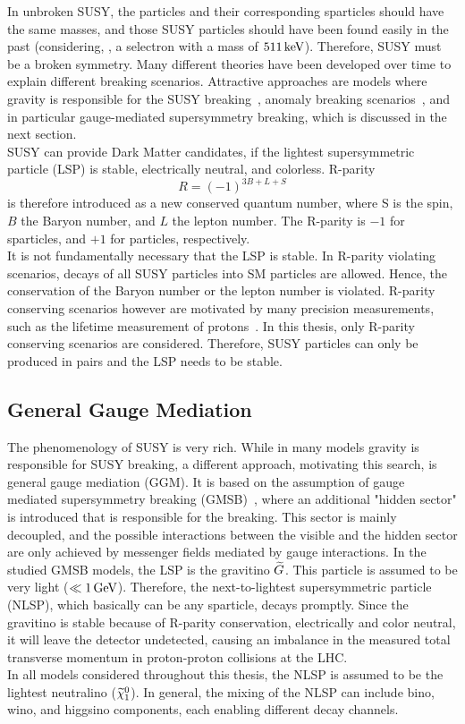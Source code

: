 In unbroken SUSY, the particles and their corresponding sparticles should have the same masses, and those SUSY particles should have been found easily in the past (considering, \eg, a selectron with a mass of $511\,\text{ke\hspace{-.08em}V}$). Therefore, SUSY must be a broken symmetry. Many different theories have been developed over time to explain different breaking scenarios. Attractive approaches are models where gravity is responsible for the SUSY breaking~\cite{SUSYPrimer}, anomaly breaking scenarios~\cite{AMSB}, and in particular gauge-mediated supersymmetry breaking, which is discussed in the next section.\\
SUSY can provide Dark Matter candidates, if the lightest supersymmetric particle (LSP) is stable, electrically neutral, and colorless.
R-parity
\begin{equation}
 R = (-1)^{3B+L+S}
\end{equation}
is therefore introduced as a new conserved quantum number, where S is the spin, $B$ the Baryon number, and $L$ the lepton number. The R-parity is $-1$ for sparticles, and $+1$ for particles, respectively.\\
It is not fundamentally necessary that the LSP is stable. In R-parity violating scenarios, decays of all SUSY particles into SM particles are allowed. Hence, the conservation of the Baryon number or the lepton number is violated. R-parity conserving scenarios however are motivated by many precision measurements, such as the lifetime measurement of protons~\cite{ProtonDecay}.
In this thesis, only R-parity conserving scenarios are considered. Therefore, SUSY particles can only be produced in pairs and the LSP needs to be stable.\\



\subsection{General Gauge Mediation}\label{sec:GGM}
The phenomenology of SUSY is very rich. While in many models gravity is responsible for SUSY breaking, a different approach, motivating this search, is general gauge mediation (GGM). It is based on the assumption of gauge mediated supersymmetry breaking (GMSB)~\cite{GGM}, where an additional "hidden sector" is introduced that is responsible for the breaking. This sector is mainly decoupled, and the possible interactions between the visible and the hidden sector are only achieved by messenger fields mediated by gauge interactions. In the studied GMSB models, the LSP is the gravitino $\widetilde{G}$. This particle is assumed to be very light ($\ll1\,\text{Ge\hspace{-.08em}V}$). Therefore, the next-to-lightest supersymmetric particle (NLSP), which basically can be any sparticle, decays promptly. Since the gravitino is stable because of R-parity conservation, electrically and color neutral, it will leave the detector undetected, causing an imbalance in the measured total transverse momentum in proton-proton collisions at the LHC.\\
In all models considered throughout this thesis, the NLSP is assumed to be the lightest neutralino ($\widetilde{\chi}^{0}_{1}$). In general, the mixing of the NLSP can include bino, wino, and higgsino components, each enabling different decay channels.


